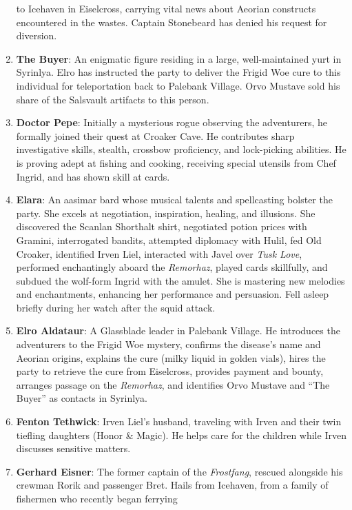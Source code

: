 \documentclass[
  letterpaper,12pt,twoside,twocolumn,openany,
  nodeprecatedcode,bg=full]{dndbook}
\begin{document}
\begin{enumerate}
  to Icehaven in Eiselcross, carrying vital news about Aeorian
  constructs encountered in the wastes. Captain Stonebeard has denied
  his request for diversion.
\item
  \textbf{The Buyer}: An enigmatic figure residing in a large,
  well-maintained yurt in Syrinlya. Elro has instructed the party to
  deliver the Frigid Woe cure to this individual for teleportation back
  to Palebank Village. Orvo Mustave sold his share of the Salsvault
  artifacts to this person.
\item
  \textbf{Doctor Pepe}: Initially a mysterious rogue observing the
  adventurers, he formally joined their quest at Croaker Cave. He
  contributes sharp investigative skills, stealth, crossbow proficiency,
  and lock-picking abilities. He is proving adept at fishing and
  cooking, receiving special utensils from Chef Ingrid, and has shown
  skill at cards.
\item
  \textbf{Elara}: An aasimar bard whose musical talents and spellcasting
  bolster the party. She excels at negotiation, inspiration, healing,
  and illusions. She discovered the Scanlan Shorthalt shirt, negotiated
  potion prices with Gramini, interrogated bandits, attempted diplomacy
  with Hulil, fed Old Croaker, identified Irven Liel, interacted with
  Javel over \emph{Tusk Love}, performed enchantingly aboard the
  \emph{Remorhaz}, played cards skillfully, and subdued the wolf-form
  Ingrid with the amulet. She is mastering new melodies and
  enchantments, enhancing her performance and persuasion. Fell asleep
  briefly during her watch after the squid attack.
\item
  \textbf{Elro Aldataur}: A Glassblade leader in Palebank Village. He
  introduces the adventurers to the Frigid Woe mystery, confirms the
  disease's name and Aeorian origins, explains the cure (milky liquid in
  golden vials), hires the party to retrieve the cure from Eiselcross,
  provides payment and bounty, arranges passage on the \emph{Remorhaz},
  and identifies Orvo Mustave and ``The Buyer'' as contacts in Syrinlya.
\item
  \textbf{Fenton Tethwick}: Irven Liel's husband, traveling with Irven
  and their twin tiefling daughters (Honor \& Magic). He helps care for
  the children while Irven discusses sensitive matters.
\item
  \textbf{Gerhard Eisner}: The former captain of the \emph{Frostfang},
  rescued alongside his crewman Rorik and passenger Bret. Hails from
  Icehaven, from a family of fishermen who recently began ferrying

\end{enumerate}
\end{document}
